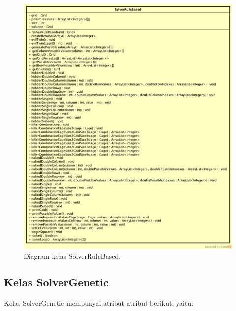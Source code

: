 \begin{figure}
\centering
\captionsetup{justification=centering}
\includegraphics[scale=0.4]{Gambar/Perancangan/DiagramKelasSolverRuleBased.png}
\caption[Diagram kelas SolverRuleBased.]{Diagram kelas SolverRuleBased.}
\label{fig:diagramkelassolverrb}
\end{figure}

\subsection{Kelas SolverGenetic}
\label{sec:kelassolvergenetic}

Kelas SolverGenetic mempunyai atribut-atribut berikut, yaitu:

